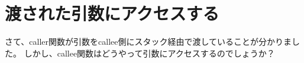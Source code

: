 \section{渡された引数にアクセスする}
\myindex{\Stack}

さて、\gls{caller}関数が引数を\gls{callee}側にスタック経由で渡していることが分かりました。
しかし、\gls{callee}関数はどうやって引数にアクセスするのでしょうか？








